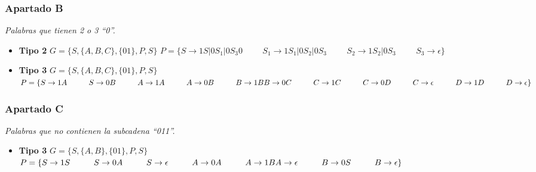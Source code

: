 \subsubsection{Apartado B} 

\textit{Palabras que tienen 2 o 3 “0”.}

\begin{itemize}
	\item \textbf{Tipo 2} \newline
	$ G = \{ S, \{ A,B,C \} , \{ 01 \}  ,P,S\} $ \newline
	$ P = \{ S \rightarrow 1S|0S_{1}|0S_{3}0 \hspace{1cm} S_{1} \rightarrow 1S_{1}|0S_{2}|0S_{3} \hspace{1cm} S_{2} \rightarrow 1S_{2}|0S_{3} \hspace{1cm} S_{3} \rightarrow \epsilon \} $
	\item \textbf{Tipo 3} \newline
	$ G = \{ S, \{ A,B,C \} , \{ 01 \}  ,P,S\} $ \newline
	$ P = \{ S \rightarrow 1A \hspace{1cm} S \rightarrow 0B \hspace{1cm} A \rightarrow 1A \hspace{1cm} A \rightarrow 0B \hspace{1cm} B \rightarrow 1B \newline  B \rightarrow 0C \hspace{1cm} C \rightarrow 1C \hspace{1cm} C \rightarrow 0D \hspace{1cm} C \rightarrow \epsilon \hspace{1cm} D \rightarrow 1D \hspace{1cm} D \rightarrow \epsilon\} $
\end{itemize}

\subsubsection{Apartado C} 

\textit{Palabras que no contienen la subcadena “011”.}

\begin{itemize}
	\item \textbf{Tipo 3} \newline
	$ G = \{ S, \{ A,B \} , \{ 01 \}  ,P,S\} $ \newline
	$ P = \{ S \rightarrow 1S \hspace{1cm} S \rightarrow 0A \hspace{1cm} S \rightarrow \epsilon \hspace{1cm} A \rightarrow 0A \hspace{1cm} A \rightarrow 1B \newline  A \rightarrow \epsilon \hspace{1cm} B \rightarrow 0S \hspace{1cm} B \rightarrow \epsilon \} $
\end{itemize}

